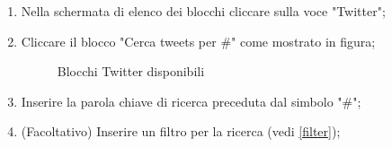 \begin{enumerate}
	\item Nella schermata di elenco dei blocchi cliccare sulla voce "Twitter";
	\item Cliccare il blocco "Cerca tweets per \#" come mostrato in figura;
	\begin{figure}[!ht]
		\centering
		\caption{Blocchi Twitter disponibili}
	\end{figure}
	\newpage
	\item Inserire la parola chiave di ricerca preceduta dal simbolo "\#";
	\item (Facoltativo) Inserire un filtro per la ricerca (vedi \ref{filter});

\end{enumerate}
